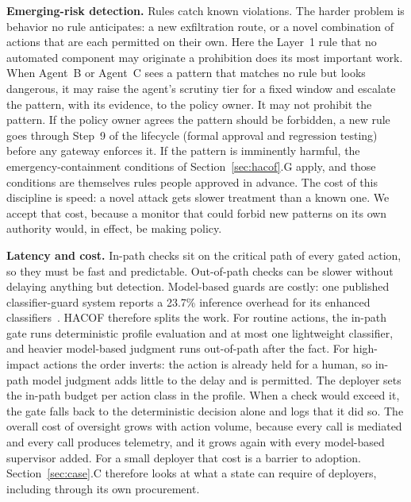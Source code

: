 \documentclass{ieeeaccess}
\newcommand{\hacof}{HACOF}
\begin{document}
\textbf{Emerging-risk detection.} Rules catch known violations. The harder problem is behavior no rule anticipates: a new exfiltration route, or a novel combination of actions that are each permitted on their own. Here the Layer~1 rule that no automated component may originate a prohibition does its most important work. When Agent~B or Agent~C sees a pattern that matches no rule but looks dangerous, it may raise the agent's scrutiny tier for a fixed window and escalate the pattern, with its evidence, to the policy owner. It may not prohibit the pattern. If the policy owner agrees the pattern should be forbidden, a new rule goes through Step~9 of the lifecycle (formal approval and regression testing) before any gateway enforces it. If the pattern is imminently harmful, the emergency-containment conditions of Section~\ref{sec:hacof}.G apply, and those conditions are themselves rules people approved in advance. The cost of this discipline is speed: a novel attack gets slower treatment than a known one. We accept that cost, because a monitor that could forbid new patterns on its own authority would, in effect, be making policy.

\textbf{Latency and cost.} In-path checks sit on the critical path of every gated action, so they must be fast and predictable. Out-of-path checks can be slower without delaying anything but detection. Model-based guards are costly: one published classifier-guard system reports a 23.7\% inference overhead for its enhanced classifiers~\cite{sharma2025constitutionalclassifiers}.
\hacof{} therefore splits the work. For routine actions, the in-path gate runs deterministic profile evaluation and at most one lightweight classifier, and heavier model-based judgment runs out-of-path after the fact. For high-impact actions the order inverts: the action is already held for a human, so in-path model judgment adds little to the delay and is permitted. The deployer sets the in-path budget per action class in the profile. When a check would exceed it, the gate falls back to the deterministic decision alone and logs that it did so. The overall cost of oversight grows with action volume, because every call is mediated and every call produces telemetry, and it grows again with every model-based supervisor added. For a small deployer that cost is a barrier to adoption. Section~\ref{sec:case}.C therefore looks at what a state can require of deployers, including through its own procurement.
\end{document}
